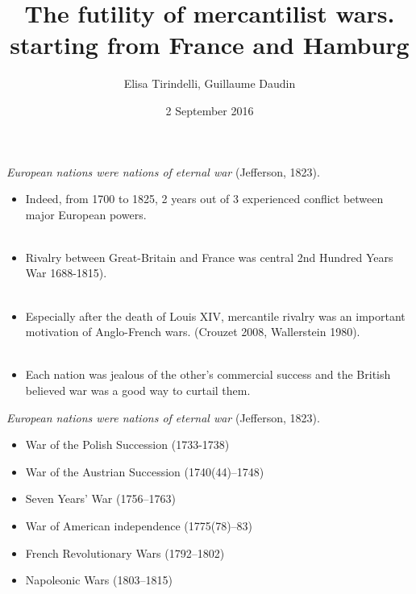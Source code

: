 \documentclass[11pt]{beamer}
\author{Elisa Tirindelli, Guillaume Daudin}
\title{The futility of mercantilist wars. starting from France and Hamburg}
\date{2 September 2016}
\begin{document}
\begin{frame}
\titlepage
\end{frame}


\begin{frame}{\textit{European nations were nations of eternal war} (Jefferson, 1823).}
\begin{itemize}
\item{Indeed, from 1700 to 1825, 2 years out of 3 experienced conflict between major European powers.}\\~\\

\item{Rivalry between Great-Britain and France was central 2nd Hundred Years War 1688-1815).}\\~\\

\item{Especially after the death of Louis XIV, mercantile rivalry was an important motivation of Anglo-French wars. (Crouzet 2008, Wallerstein 1980).}\\~\\

\item{Each nation was jealous of the other's commercial success and the British believed war was a good way to curtail them.}
\end{itemize}
\end{frame}


\begin{frame}{\textit{European nations were nations of eternal war} (Jefferson, 1823).}
\begin{itemize}
\item{War of the Polish Succession (1733-1738)}
\item{War of the Austrian Succession (1740(44)–1748)}
\item{Seven Years' War (1756–1763)}
\item{War of American independence (1775(78)–83)}
\item{French Revolutionary Wars (1792–1802)}
\item{Napoleonic Wars (1803–1815)}
\end{itemize}
\end{frame}
\end{document}
